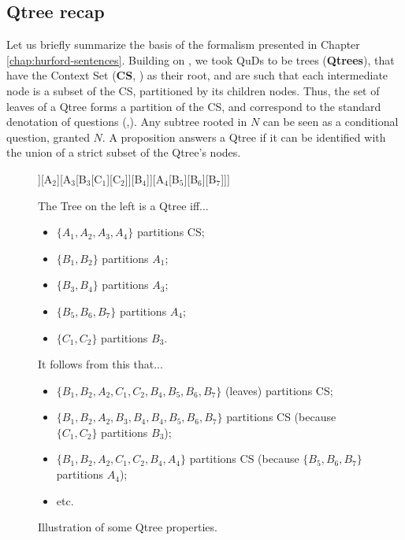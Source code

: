 \subsection{Qtree recap}
Let us briefly summarize the basis of the formalism presented in Chapter \ref{chap:hurford-sentences}. Building on \citet{Buring2003,Riester2019,Onea2016,Zhang2024}, we took QuDs to be trees (\textbf{Qtrees}), that have the Context Set (\textbf{CS}, \cite{Stalnaker1974}) as their root, and are such that each intermediate node is a subset of the CS, partitioned by its children nodes. Thus, the set of leaves of a Qtree forms a partition of the CS, and correspond to the standard denotation of questions (,). Any subtree rooted in $N$ can be seen as a conditional question, granted $N$. A proposition answers a Qtree if it can be identified with the union of a strict subset of the Qtree's nodes.

\begin{figure}[H]
	\begin{multicols}{2}
		\begin{forest}
			[CS[A$_1$ [B$_1$][B$_2$]][A$_2$][A$_3$[B$_3$[C$_1$][C$_2$]][B$_4$]][A$_4$[B$_5$][B$_6$][B$_7$]]]
		\end{forest}
		\columnbreak
		\begin{small}
			
			The Tree on the left is a Qtree iff...
			\begin{itemize}
				\item $\lbrace A_1, A_2, A_3, A_4\rbrace$ partitions CS;
				\item $\lbrace B_1, B_2\rbrace$ partitions $A_1$;
				\item  $\lbrace B_3, B_4\rbrace$ partitions $A_3$;
				\item $\lbrace B_5, B_6, B_7\rbrace$ partitions $A_4$;
				\item $\lbrace C_1, C_2\rbrace$ partitions $B_3$.
			\end{itemize}
		\end{small}
	\end{multicols}
	\small
	It follows from this that...
	\begin{itemize}
		\item $\lbrace B_1, B_2, A_2, C_1, C_2, B_4, B_5, B_6, B_7\rbrace$ (leaves) partitions CS;
		\item $\lbrace B_1, B_2, A_2, B_3, B_4, B_4, B_5, B_6, B_7\rbrace$ partitions CS (because $\lbrace C_1, C_2\rbrace$ partitions $B_3$);
		\item $\lbrace B_1, B_2, A_2, C_1, C_2, B_4, A_4\rbrace$ partitions CS (because $\lbrace B_5, B_6, B_7\rbrace$ partitions $A_4$);
		\item etc.
	\end{itemize}
	\caption{Illustration of some Qtree properties.}
\end{figure}


